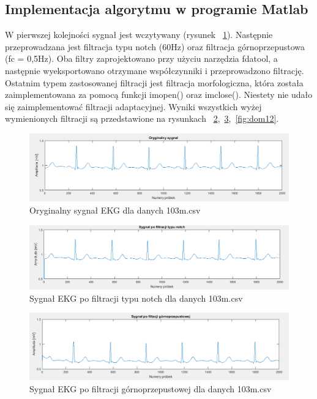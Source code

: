 \documentclass[10pt,a4paper]{article}
\begin{document}
\subsection{Implementacja algorytmu w programie Matlab}

W pierwszej kolejności sygnał jest wczytywany (rysunek ~\ref{fig:dom9}). Następnie przeprowadzana jest filtracja typu notch (60Hz) oraz filtracja górnoprzepustowa (fc = 0,5Hz). Oba filtry zaprojektowano przy użyciu narzędzia fdatool, a następnie wyeksportowano otrzymane współczynniki i przeprowadzono filtrację. Ostatnim typem zastosowanej filtracji jest filtracja morfologiczna, która została zaimplementowana za pomocą funkcji imopen() oraz imclose(). Niestety nie udało się zaimplementować filtracji adaptacyjnej.  Wyniki wszystkich wyżej wymienionych filtracji są przedstawione na rysunkach ~\ref{fig:dom10},~\ref{fig:dom11},~\ref{fig:dom12}.

\begin{figure}
  	\centering
    \includegraphics[width=1\textwidth]{dom9}
    \caption{Oryginalny sygnał EKG dla danych 103m.csv}
  	\label{fig:dom9}
\end{figure}

\begin{figure}
  	\centering
    \includegraphics[width=1\textwidth]{dom10}
    \caption{Sygnał EKG po filtracji typu notch dla danych 103m.csv}
  	\label{fig:dom10}
\end{figure}

\begin{figure}
  	\centering
    \includegraphics[width=1\textwidth]{dom11}
    \caption{Sygnał EKG po filtracji górnoprzepustowej dla danych 103m.csv}
  	\label{fig:dom11}
\end{figure}
\end{document}
